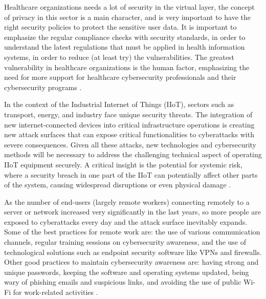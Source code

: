\documentclass[journal]{IEEEtran}
\begin{document}
Healthcare organizations needs a lot of security in the virtual layer, the concept of privacy in this sector is a main character, and is very important to have the right security policies to protect the sensitive user data. 
It is important to emphasize the regular compliance checks with security standards, in order to understand the latest regulations that must be applied in health information systems, in order to reduce (at least try) the vulnerabilities.
The greatest vulnerability in healthcare organizations is the human factor, emphasizing the need for more support for healthcare cybersecurity professionals and their cybersecurity programs \cite{Edu_article3}.

In the context of the Industrial Internet of Things (IIoT), sectors such as transport, energy, and industry face unique security threats. The integration of new internet-connected devices into critical infrastructure operations is creating new attack surfaces that can expose critical functionalities to cyberattacks with severe consequences. Given all these attacks, new technologies and cybersecurity methods will be necessary to address the challenging technical aspect of operating IIoT equipment securely.
 A critical insight is the potential for systemic risk, where a security breach in one part of the IIoT can potentially affect other parts of the system, causing widespread disruptions or even physical damage \cite{sobral_1}.

As the number of end-users (largely remote workers) connecting remotely to a server or network increased very significantly in the last years, so more people are exposed to cyberattacks every day and the attack surface inevitably expands. Some of the best practices for remote work are: the use of various communication channels, regular training sessions on cybersecurity awareness, and the use of technological solutions such as endpoint security software like VPNs and firewalls. Other good practices to maintain cybersecurity awareness are: having strong and unique passwords, keeping the software and operating systems updated, being wary of phishing emails and suspicious links, and avoiding the use of public Wi-Fi for work-related activities \cite{sobral_2}.
\end{document}
